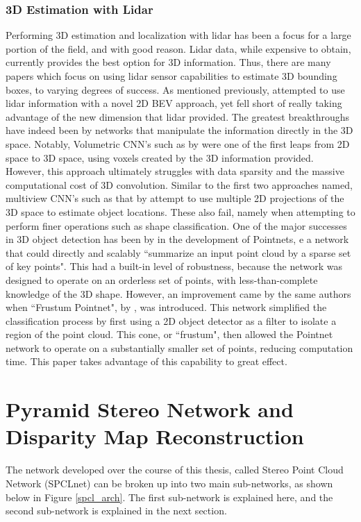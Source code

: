 \subsubsection{3D Estimation with Lidar}
Performing 3D estimation and localization with lidar has been a focus for a large portion of the field, and with good reason. Lidar data, while expensive to obtain, currently provides the best option for 3D information. Thus, there are many papers which focus on using lidar sensor capabilities to estimate 3D bounding boxes, to varying degrees of success. As mentioned previously, \cite{zeng2018rt3d} attempted to use lidar information with a novel 2D BEV approach, yet fell short of really taking advantage of the new dimension that lidar provided. The greatest breakthroughs have indeed been by networks that manipulate the information directly in the 3D space. Notably, Volumetric CNN's such as by \cite{wu20153d} were one of the first leaps from 2D space to 3D space, using voxels created by the 3D information provided. However, this approach ultimately struggles with data sparsity and the massive computational cost of 3D convolution. Similar to the first two approaches named, multiview CNN's such as that by \cite{su2015multi} attempt to use multiple 2D projections of the 3D space to estimate object locations. These also fail, namely when attempting to perform finer operations such as shape classification. One of the major successes in 3D object detection has been by \cite{qi_pointnet:_2017} in the development of Pointnets, e a network that could directly and scalably ``summarize an input point cloud by a sparse set of key points". This had a built-in level of robustness, because the network was designed to operate on an orderless set of points, with less-than-complete knowledge of the 3D shape. However, an improvement came by the same authors when ``Frustum Pointnet", by \cite{qi_frustum_2017}, was introduced. This network simplified the classification process by first using a 2D object detector as a filter to isolate a region of the point cloud. This cone, or ``frustum", then allowed the Pointnet network to operate on a substantially smaller set of points, reducing computation time. This paper takes advantage of this capability to great effect.

\newpage
\section{Pyramid Stereo Network and Disparity Map Reconstruction} %
\label{sect_psmnet}
The network developed over the course of this thesis, called Stereo Point Cloud Network (SPCLnet) can be broken up into two main sub-networks, as shown below in Figure \ref{spcl_arch}. The first sub-network is explained here, and the second sub-network is explained in the next section.

